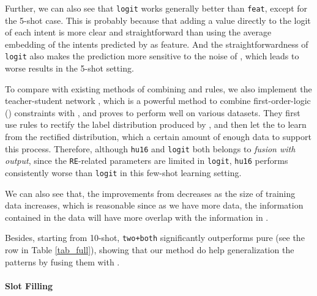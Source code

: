 Further, we can also see that \texttt{logit} works generally better than \texttt{feat}, except for the 5-shot case. This is probably because that adding a value directly to the logit of each intent is more clear and straightforward than using the average embedding of the intents predicted by \RE as feature. And the straightforwardness of \texttt{logit} also makes the prediction more sensitive to the noise of \RE, which leads to worse results in the 5-shot setting.

To compare with existing methods of combining \NN and rules, we also implement the teacher-student network \cite{liu2016attention}, which is a powerful method to combine first-order-logic (\FOL) constraints with \NN, and proves to perform well on various datasets. 
They first use \FOL rules to rectify the label distribution produced by \NN, and then let the \NN to learn from the rectified distribution, which a certain amount of enough data to support this process. 
Therefore, although \texttt{hu16} and \texttt{logit} both belongs to \emph{fusion with output},
since the \texttt{RE}-related parameters are limited in \texttt{logit},
\texttt{hu16} performs consistently worse than \texttt{logit} in this few-shot learning setting.

We can also see that, the improvements from \RE decreases as the size of training data increases, 
which is reasonable since as we have more data, the information contained in the data will have more overlap with the information in \RE. 

Besides, starting from 10-shot, \texttt{two+both} significantly outperforms pure \RE (see the \RE row in Table \ref{tab_full}), showing that our method do help generalization the \RE patterns by fusing them with \NN. 


\paragraph{Slot Filling}


